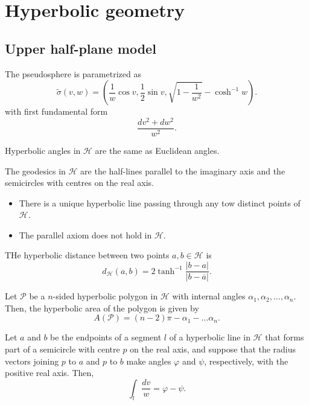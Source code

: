 \section{Hyperbolic geometry}

\subsection{Upper half-plane model}

The pseudosphere is parametrized as
\[
  \tilde{\sigma}(v, w) = \left(
    \frac{1}{w}\cos v,
    \frac{1}{2} \sin v,
    \sqrt{1 - \frac{1}{w^2}} - \cosh^{-1}w
  \right).
\]
with first fundamental form
\[
  \frac{dv^2 + dw^2}{w^2}.
\]

\begin{proposition}
  Hyperbolic angles in $\mathcal{H}$ are the same as Euclidean angles.
\end{proposition}

\begin{proposition}
  The geodesics in $\mathcal{H}$ are the half-lines parallel to the imaginary axis
  and the semicircles with centres on the real axis.
\end{proposition}

\begin{proposition}
  \begin{itemize}
    \item There is a unique hyperbolic line passing through any tow distinct points of $\mathcal{H}$.
    \item The parallel axiom does not hold in $\mathcal{H}$.
  \end{itemize}
\end{proposition}

\begin{proposition}
  THe hyperbolic distance between two points $a, b \in \mathcal{H}$ is
  \[
    d_{\mathcal{H}}(a, b) = 2 \tanh^{-1}\frac{|b - a|}{|b - \overline{a}|}.
  \]
\end{proposition}

\begin{theorem}
  Let $\mathcal{P}$ be a $n$-sided hyperbolic polygon in $\mathcal{H}$ with internal angles
  $\alpha_1, \alpha_2, \dots, \alpha_n$.
  Then, the hyperbolic area of the polygon is given by
  \[
    A(\mathcal{P}) = (n - 2)\pi - \alpha_1 - \dots \alpha_n.
  \]
\end{theorem}

\begin{lemma}
  Let $a$ and $b$ be the endpoints of a segment $l$ of a hyperbolic line in $\mathcal{H}$
  that forms part of a semicircle with centre $p$ on the real axis, and suppose that the
  radius vectors joining $p$ to $a$ and $p$ to $b$ make angles $\varphi$ and $\psi$,
  respectively, with the positive real axis. Then,
  \[
    \int_l \frac{dv}{w}   = \varphi - \psi.
  \]
\end{lemma}

